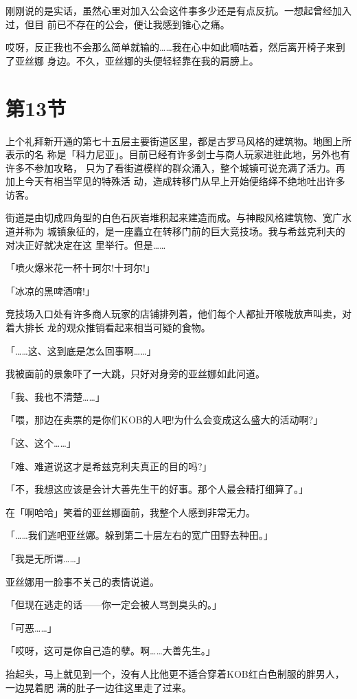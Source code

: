 \documentclass[11pt]{book}
\begin{document}
刚刚说的是实话，虽然心里对加入公会这件事多少还是有点反抗。一想起曾经加入过，但目
前已不存在的公会，便让我感到锥心之痛。

哎呀，反正我也不会那么简单就输的……我在心中如此嘀咕着，然后离开椅子来到了亚丝娜
身边。不久，亚丝娜的头便轻轻靠在我的肩膀上。
\section{第13节}
\label{sec:org74d9beb}
上个礼拜新开通的第七十五层主要街道区里，都是古罗马风格的建筑物。地图上所表示的名
称是「科力尼亚」。目前已经有许多剑士与商人玩家进驻此地，另外也有许多不参加攻略，
只为了看街道模样的群众涌入，整个城镇可说充满了活力。再加上今天有相当罕见的特殊活
动，造成转移门从早上开始便络绎不绝地吐出许多访客。

街道是由切成四角型的白色石灰岩堆积起来建造而成。与神殿风格建筑物、宽广水道并称为
城镇象征的，是一座矗立在转移门前的巨大竞技场。我与希兹克利夫的对决正好就决定在这
里举行。但是……

「喷火爆米花一杯十珂尔!十珂尔!」

「冰凉的黑啤酒唷!」

竞技场入口处有许多商人玩家的店铺排列着，他们每个人都扯开喉咙放声叫卖，对着大排长
龙的观众推销看起来相当可疑的食物。

「……这、这到底是怎么回事啊……」

我被面前的景象吓了一大跳，只好对身旁的亚丝娜如此问道。

「我、我也不清楚……」

「喂，那边在卖票的是你们KOB的人吧!为什么会变成这么盛大的活动啊?」

「这、这个……」

「难、难道说这才是希兹克利夫真正的目的吗?」

「不，我想这应该是会计大善先生干的好事。那个人最会精打细算了。」

在「啊哈哈」笑着的亚丝娜面前，我整个人感到非常无力。

「……我们逃吧亚丝娜。躲到第二十层左右的宽广田野去种田。」

「我是无所谓……」

亚丝娜用一脸事不关己的表情说道。

「但现在逃走的话——你一定会被人骂到臭头的。」

「可恶……」

「哎呀，这可是你自己造的孽。啊……大善先生。」

抬起头，马上就见到一个，没有人比他更不适合穿着KOB红白色制服的胖男人，一边晃着肥
满的肚子一边往这里走了过来。
\end{document}
